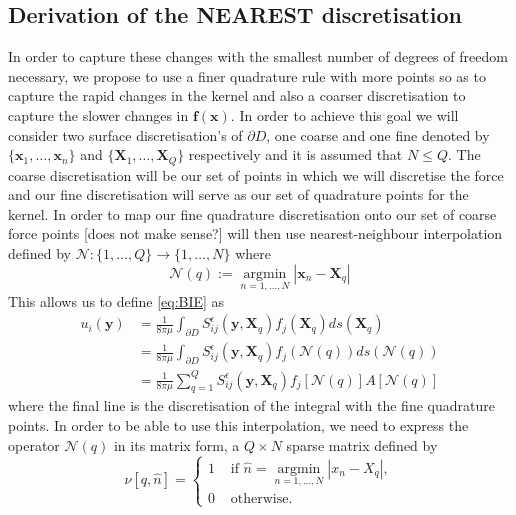 \subsection{Derivation of the NEAREST discretisation}
In order to capture these changes with the smallest number of degrees of freedom necessary, we propose to use a finer quadrature rule with more points so as to capture the rapid changes in the kernel and also a coarser discretisation to capture the slower changes in $\bm{f}(\bm{x})$. In order to achieve this goal we will consider two surface discretisation’s of $\partial D$, one coarse and one fine denoted by $\{\bm{x}_1, \dots, \bm{x}_n\}$ and $\{\bm{X}_1, \dots, \bm{X}_Q\}$ respectively and it is assumed that $N \leq Q$. The coarse discretisation will be our set of points in which we will discretise the force and our fine discretisation will serve as our set of quadrature points for the kernel. In order to map our fine quadrature discretisation onto our set of coarse force points [does not make sense?] will then use nearest-neighbour interpolation defined by $\mathcal{N}:\{ 1, \dots, Q\} \to \{ 1, \dots, N\}$ where 
\begin{equation}
    \mathcal{N}(q) := \underset{n=1, \ldots, N}{\operatorname{argmin}}|\boldsymbol{x}_n-\boldsymbol{X}_q|
\end{equation}
This allows us to define \cref{eq:BIE} as 
\begin{equation}
\begin{aligned}
\label{eq:BIENearest1}
        u_i(\bm{y}) &= \frac{1}{8 \pi \mu} \int_{\partial D} S_{i j}^{\epsilon}\left(\bm{y}, \bm{X}_q\right) f_{j}(\bm{X}_q) d s(\bm{X}_q) \\
        &= \frac{1}{8 \pi \mu} \int_{\partial D} S_{i j}^{\epsilon}\left(\bm{y}, \bm{X}_q\right) f_{j}(\mathcal{N}(q)) d s(\mathcal{N}(q)) \\
        & = \frac{1}{8 \pi \mu} \sum_{q=1}^Q S_{i j}^{\epsilon}\left(\bm{y}, \bm{X}_q\right){f_{j}}[\mathcal{N}(q)]A[\mathcal{N}(q)]
\end{aligned}
\end{equation}
where the final line is the discretisation of the integral with the fine quadrature points. In order to be able to use this interpolation, we need to express the operator $\mathcal{N}(q)$ in its matrix form, a $Q \times N$ sparse matrix defined by
\begin{equation}
\label{eq:NNMatrix}
    \nu [q, \hat{n}]= \begin{cases} 1 & \text { if } \hat{n}=\underset{n=1, \ldots, N}{\operatorname{argmin}}|x_n-X_q| , \\ 0 & \text { otherwise. }\end{cases}
\end{equation}
